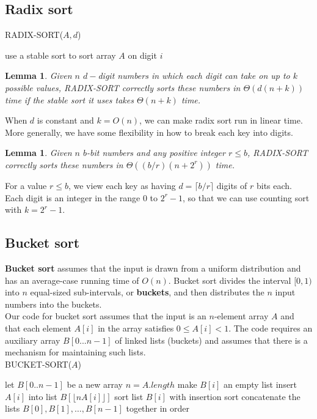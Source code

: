 \documentclass[12pt]{article}
\newtheorem{lemma}[theorem]{Lemma}
\begin{document}
\subsection{Radix sort}

RADIX-SORT($A, d$)
\begin{algorithmic}[1]
	\State use a stable sort to sort array $A$ on digit $i$
\EndFor
\end{algorithmic}

\begin{lemma}
  Given $n$ $d-$digit numbers in which each digit can take on up to $k$ possible values, RADIX-SORT correctly sorts these numbers in $\Theta(d(n+k))$ time if the stable sort it uses takes $\Theta (n+k)$ time.
\end{lemma}

When $d$ is constant and $k = O(n)$, we can make radix sort run in linear time. More generally, we have some flexibility in how to break each key into digits.

\begin{lemma}
  Given $n$ $b$-bit numbers and any positive integer $r \le b$, RADIX-SORT correctly sorts these numbers in $\Theta ((b/r)(n + 2^r))$ time.
\end{lemma}

For a value $r \le b$, we view each key as having $d = \lceil b/r \rceil$ digits of $r$ bits each. Each digit is an integer in the range $0$ to $2^r-1$, so that we can use counting sort with $k = 2^r -1$.

\subsection{Bucket sort}

\textbf {Bucket sort} assumes that the input is drawn from a uniform distribution and has an average-case running time of $O(n)$. Bucket sort divides the interval $[0,1)$ into $n$ equal-sized sub-intervals, or \textbf {buckets}, and then distributes the $n$ input numbers into the buckets. \\

Our code for bucket sort assumes that the input is an $n$-element array $A$ and that each element $A[i]$ in the array satisfies $0 \le A[i] < 1$. The code requires an auxiliary array $B[0...n-1]$ of linked lists (buckets) and assumes that there is a mechanism for maintaining such lists. \\

BUCKET-SORT($A$)
\begin{algorithmic}[1]
\State let $B[0..n-1]$ be a new array
\State $n = A.length$
	\State make $B[i]$ an empty list
\EndFor
{}
	\State insert $A[i]$ into list $B[\lfloor nA[i] \rfloor ]$
\EndFor
{}
	\State sort list $B[i]$ with insertion sort
\EndFor
\State concatenate the lists $B[0], B[1], \dots, B[n-1]$ together in order
\end{algorithmic}
\end{document}
